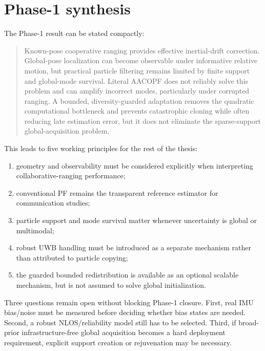 \section{Phase-1 synthesis}

The Phase-1 result can be stated compactly:

\begin{quote}
Known-pose cooperative ranging provides effective inertial-drift correction. Global-pose localization can become observable under informative relative motion, but practical particle filtering remains limited by finite support and global-mode survival. Literal AACOPF does not reliably solve this problem and can amplify incorrect modes, particularly under corrupted ranging. A bounded, diversity-guarded adaptation removes the quadratic computational bottleneck and prevents catastrophic cloning while often reducing late estimation error, but it does not eliminate the sparse-support global-acquisition problem.
\end{quote}

This leads to five working principles for the rest of the thesis:
\begin{enumerate}
    \item geometry and observability must be considered explicitly when interpreting collaborative-ranging performance;
    \item conventional PF remains the transparent reference estimator for communication studies;
    \item particle support and mode survival matter whenever uncertainty is global or multimodal;
    \item robust UWB handling must be introduced as a separate mechanism rather than attributed to particle copying;
    \item the guarded bounded redistribution is available as an optional scalable mechanism, but is not assumed to solve global initialization.
\end{enumerate}

Three questions remain open without blocking Phase-1 closure. First, real IMU bias/noise must be measured before deciding whether bias states are needed. Second, a robust NLOS/reliability model still has to be selected. Third, if broad-prior infrastructure-free global acquisition becomes a hard deployment requirement, explicit support creation or rejuvenation may be necessary.

